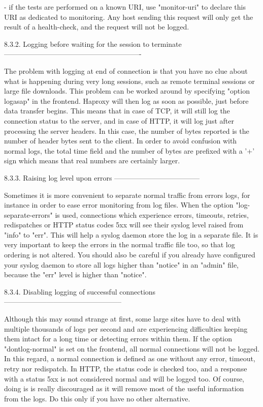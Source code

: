   - if the tests are performed on a known URI, use "monitor-uri" to declare
    this URI as dedicated to monitoring. Any host sending this request will
    only get the result of a health-check, and the request will not be logged.


8.3.2. Logging before waiting for the session to terminate
----------------------------------------------------------

The problem with logging at end of connection is that you have no clue about
what is happening during very long sessions, such as remote terminal sessions
or large file downloads. This problem can be worked around by specifying
"option logasap" in the frontend. Haproxy will then log as soon as possible,
just before data transfer begins. This means that in case of TCP, it will still
log the connection status to the server, and in case of HTTP, it will log just
after processing the server headers. In this case, the number of bytes reported
is the number of header bytes sent to the client. In order to avoid confusion
with normal logs, the total time field and the number of bytes are prefixed
with a '+' sign which means that real numbers are certainly larger.


8.3.3. Raising log level upon errors
------------------------------------

Sometimes it is more convenient to separate normal traffic from errors logs,
for instance in order to ease error monitoring from log files. When the option
"log-separate-errors" is used, connections which experience errors, timeouts,
retries, redispatches or HTTP status codes 5xx will see their syslog level
raised from "info" to "err". This will help a syslog daemon store the log in
a separate file. It is very important to keep the errors in the normal traffic
file too, so that log ordering is not altered. You should also be careful if
you already have configured your syslog daemon to store all logs higher than
"notice" in an "admin" file, because the "err" level is higher than "notice".


8.3.4. Disabling logging of successful connections
--------------------------------------------------

Although this may sound strange at first, some large sites have to deal with
multiple thousands of logs per second and are experiencing difficulties keeping
them intact for a long time or detecting errors within them. If the option
"dontlog-normal" is set on the frontend, all normal connections will not be
logged. In this regard, a normal connection is defined as one without any
error, timeout, retry nor redispatch. In HTTP, the status code is checked too,
and a response with a status 5xx is not considered normal and will be logged
too. Of course, doing is is really discouraged as it will remove most of the
useful information from the logs. Do this only if you have no other
alternative.


